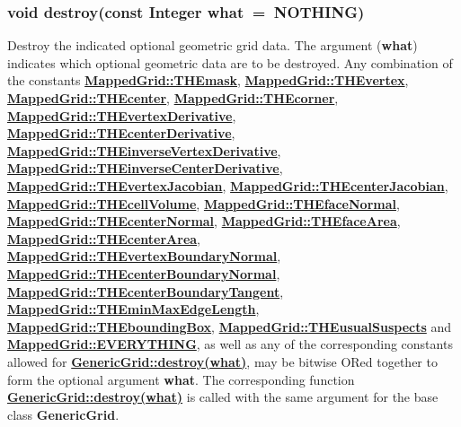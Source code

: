 \documentclass{article}
\begin{document}
  \subsubsection{void destroy(const Integer what~=~NOTHING)}
  \label{MappedGrid::destroy(what)}
    Destroy the indicated optional geometric grid data.
    The argument (\textbf{what}) indicates which optional
    geometric data are to be destroyed.  Any combination of the constants
    {\bf{}\hyperref{THEmask}{THEmask \rm(\S}{)}{MappedGrid::THEmask}},
    {\bf{}\hyperref{THEvertex}{THEvertex \rm(\S}{)}{MappedGrid::THEvertex}},
    {\bf{}\hyperref{THEcenter}{THEcenter \rm(\S}{)}{MappedGrid::THEcenter}},
    {\bf{}\hyperref{THEcorner}{THEcorner \rm(\S}{)}{MappedGrid::THEcorner}},
    {\bf{}\hyperref{THEvertexDerivative}{THEvertexDerivative \rm(\S}{)}{MappedGrid::THEvertexDerivative}},
    {\bf{}\hyperref{THEcenterDerivative}{THEcenterDerivative \rm(\S}{)}{MappedGrid::THEcenterDerivative}},
    {\bf{}\hyperref{THEinverseVertexDerivative}{THEinverseVertexDerivative \rm(\S}{)}{MappedGrid::THEinverseVertexDerivative}},
    {\bf{}\hyperref{THEinverseCenterDerivative}{THEinverseCenterDerivative \rm(\S}{)}{MappedGrid::THEinverseCenterDerivative}},
    {\bf{}\hyperref{THEvertexJacobian}{THEvertexJacobian \rm(\S}{)}{MappedGrid::THEvertexJacobian}},
    {\bf{}\hyperref{THEcenterJacobian}{THEcenterJacobian \rm(\S}{)}{MappedGrid::THEcenterJacobian}},
    {\bf{}\hyperref{THEcellVolume}{THEcellVolume \rm(\S}{)}{MappedGrid::THEcellVolume}},
    {\bf{}\hyperref{THEfaceNormal}{THEfaceNormal \rm(\S}{)}{MappedGrid::THEfaceNormal}},
    {\bf{}\hyperref{THEcenterNormal}{THEcenterNormal \rm(\S}{)}{MappedGrid::THEcenterNormal}},
    {\bf{}\hyperref{THEfaceArea}{THEfaceArea \rm(\S}{)}{MappedGrid::THEfaceArea}},
    {\bf{}\hyperref{THEcenterArea}{THEcenterArea \rm(\S}{)}{MappedGrid::THEcenterArea}},
    {\bf{}\hyperref{THEvertexBoundaryNormal}{THEvertexBoundaryNormal \rm(\S}{)}{MappedGrid::THEvertexBoundaryNormal}},
    {\bf{}\hyperref{THEcenterBoundaryNormal}{THEcenterBoundaryNormal \rm(\S}{)}{MappedGrid::THEcenterBoundaryNormal}},
    {\bf{}\hyperref{THEcenterBoundaryTangent}{THEcenterBoundaryTangent \rm(\S}{)}{MappedGrid::THEcenterBoundaryTangent}},
    {\bf{}\hyperref{THEminMaxEdgeLength}{THEminMaxEdgeLength \rm(\S}{)}{MappedGrid::THEminMaxEdgeLength}},
    {\bf{}\hyperref{THEboundingBox}{THEboundingBox \rm(\S}{)}{MappedGrid::THEboundingBox}},
    {\bf{}\hyperref{THEusualSuspects}{THEusualSuspects \rm(\S}{)}{MappedGrid::THEusualSuspects}} and
    {\bf{}\hyperref{EVERYTHING}{EVERYTHING \rm(\S}{)}{MappedGrid::EVERYTHING}},
    as well as any of the corresponding constants allowed for
    {\bf{}\hyperref{GenericGrid::destroy(what)}{GenericGrid::destroy(what) \rm(\S}{)}{GenericGrid::destroy(what)}},
    may be bitwise ORed together to form the optional argument \textbf{what}.
    The corresponding function
    {\bf{}\hyperref{destroy(what)}{destroy(what) \rm(\S}{)}{GenericGrid::destroy(what)}}
    is called with the same argument for the base class \textbf{GenericGrid}.
\end{document}
